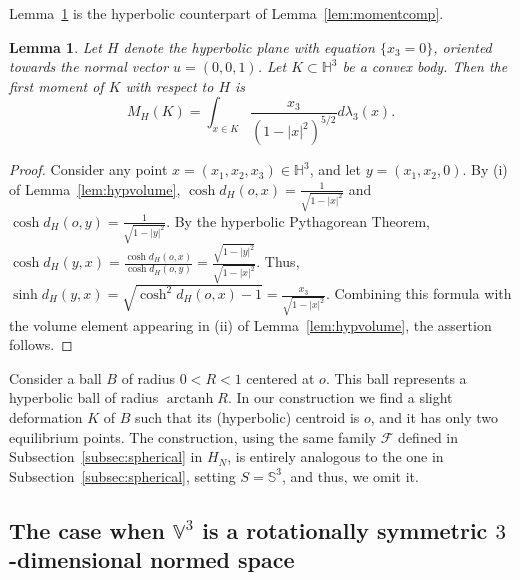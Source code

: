 \documentclass[twoside]{amsart}
\theoremstyle{plain}
\newtheorem{lemma}[theorem]{Lemma}
\theoremstyle{definition}
\numberwithin{equation}{section}
\newcommand{\HHH}{\mathbb{H}}
\newcommand{\Sph}{\mathbb{S}}
\newcommand{\V}{\mathbb{V}}
\DeclareMathOperator{\arctanh}{arctanh}
\begin{document}
Lemma~\ref{lem:momentcomphyp} is the hyperbolic counterpart of Lemma~\ref{lem:momentcomp}.

\begin{lemma}\label{lem:momentcomphyp}
Let $H$ denote the hyperbolic plane with equation $\{x_3 = 0\}$, oriented towards the normal vector $u=(0,0,1)$. Let $K \subset \HHH^3$ be a convex body. Then the first moment of $K$ with respect to $H$ is
\begin{equation}\label{eq:momentcomphyp}
M_{H}(K) = \int_{x \in K} \frac{x_3}{\left( 1- |x|^2 \right)^{5/2}} d \lambda_3(x).
\end{equation}
\end{lemma}

\begin{proof}
Consider any point $x=(x_1,x_2,x_3) \in \HHH^3$, and let $y=(x_1,x_2,0)$. By (i) of Lemma~\ref{lem:hypvolume}, $\cosh d_H(o,x)= \frac{1}{\sqrt{1-|x|^2}}$ and $\cosh d_H(o,y) = \frac{1}{\sqrt{1-|y|^2}}$.  By the hyperbolic Pythagorean Theorem, $\cosh d_H(y,x) = \frac{\cosh d_H(o,x)}{\cosh d_H(o,y)} = \frac{\sqrt{1-|y|^2}}{\sqrt{1-|x|^2}}$. Thus, $\sinh d_H(y,x) = \sqrt{\cosh^2 d_H(o,x)-1} = \frac{x_3}{\sqrt{1-|x|^2}}$. Combining this formula with the volume element appearing in (ii) of Lemma~\ref{lem:hypvolume}, the assertion follows.
\end{proof}

Consider a ball $B$ of radius $0 < R < 1$ centered at $o$. This ball represents a hyperbolic ball of radius $\arctanh R$. In our construction we find a slight deformation $K$ of $B$ such that its (hyperbolic) centroid is $o$, and it has only two equilibrium points. The construction, using the same family $\mathcal{F}$ defined in Subsection~\ref{subsec:spherical} in $H_N$, is entirely analogous to the one in Subsection~\ref{subsec:spherical}, setting $S= \Sph^3$, and thus, we omit it.


\subsection{The case when $\V^3$ is a rotationally symmetric $3$-dimensional normed space}\label{subsec:normed}
\end{document}
